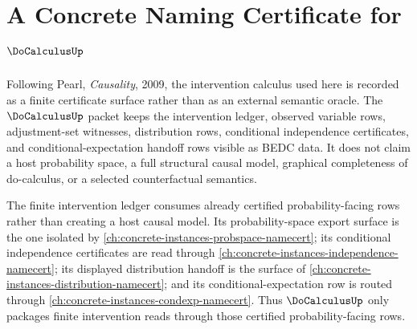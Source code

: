 \chapter{A Concrete Naming Certificate for $\DoCalculusUp$}
\label{ch:concrete-instances-do-calculus-namecert}

Following Pearl, \emph{Causality}, 2009, the intervention calculus used here is
recorded as a finite certificate surface rather than as an external semantic
oracle. The $\DoCalculusUp$ packet keeps the intervention ledger, observed
variable rows, adjustment-set witnesses, distribution rows, conditional
independence certificates, and conditional-expectation handoff rows visible as
BEDC data. It does not claim a host probability space, a full structural causal
model, graphical completeness of do-calculus, or a selected counterfactual
semantics.

The finite intervention ledger consumes already certified probability-facing
rows rather than creating a host causal model. Its probability-space export
surface is the one isolated by
\autoref{ch:concrete-instances-probspace-namecert}; its conditional
independence certificates are read through
\autoref{ch:concrete-instances-independence-namecert}; its displayed
distribution handoff is the surface of
\autoref{ch:concrete-instances-distribution-namecert}; and its
conditional-expectation row is routed through
\autoref{ch:concrete-instances-condexp-namecert}. Thus $\DoCalculusUp$ only
packages finite intervention reads through those certified probability-facing
rows.

